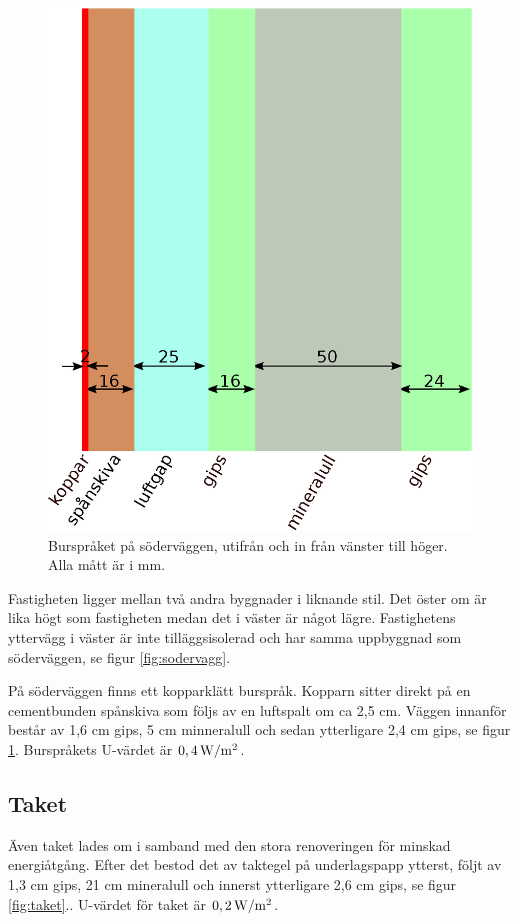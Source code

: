 \begin{figure}[hpbt]
\centering
\includegraphics[width=0.3\textheight]{images/bursprak.eps}
\caption{\label{fig:bursprak}{Burspråket på söderväggen, utifrån och in från vänster till höger. Alla mått är i mm.}}
\end{figure}

Fastigheten ligger mellan två andra byggnader i liknande stil. Det öster om är lika högt som fastigheten medan det i väster är något lägre. Fastighetens yttervägg i väster är inte tilläggsisolerad och har samma uppbyggnad som söderväggen, se figur \ref{fig:sodervagg}.

På söderväggen finns ett kopparklätt burspråk. Kopparn sitter direkt på en cementbunden spånskiva som följs av en luftspalt om ca 2,5 cm. Väggen innanför består av 1,6 cm gips, 5 cm minneralull och sedan ytterligare 2,4 cm gips, se figur \ref{fig:bursprak}.\cite{kandidatarbete2010} Burspråkets U-värdet är $\unit[0,4]{W/m^2}$.

\subsection{Taket}
Även taket lades om i samband med den stora renoveringen för minskad energiåtgång. Efter det bestod det av taktegel på underlagspapp ytterst, följt av 1,3 cm gips, 21 cm mineralull och innerst ytterligare 2,6 cm gips, se figur \ref{fig:taket}.\cite{kandidatarbete2010}. U-värdet för taket är $\unit[0,2]{W/m^2}$.

